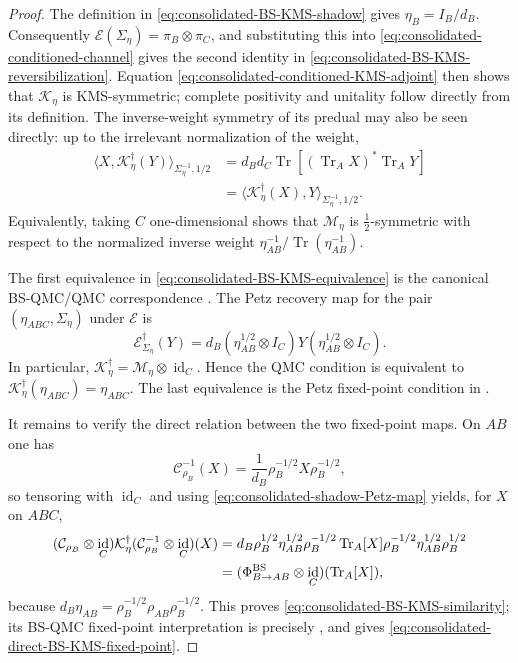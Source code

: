 \documentclass[11pt]{article}
\theoremstyle{remark}
\DeclareMathOperator{\id}{id}
\newcommand{\1}{\mathbbm{1}}
\begin{document}
\begin{proof}
The definition in \eqref{eq:consolidated-BS-KMS-shadow} gives
$\eta_B=I_B/d_B$.  Consequently
$\mathcal E(\Sigma_\eta)=\pi_B\otimes\pi_C$, and substituting this
into \eqref{eq:consolidated-conditioned-channel} gives the second
identity in \eqref{eq:consolidated-BS-KMS-reversibilization}.
Equation \eqref{eq:consolidated-conditioned-KMS-adjoint} then shows
that $\mathcal K_\eta$ is KMS-symmetric; complete positivity and
unitality follow directly from its definition.
The inverse-weight symmetry of its predual may also be seen directly:
up to the irrelevant normalization of the weight,
\begin{equation}
 \begin{aligned}
 \langle X,\mathcal K_\eta^\dagger(Y)
 \rangle_{\Sigma_\eta^{-1},1/2}
 &=d_Bd_C\operatorname{Tr}\!\left[
       (\operatorname{Tr}_A X)^*\operatorname{Tr}_A Y\right]\\
 &=\langle\mathcal K_\eta^\dagger(X),Y
 \rangle_{\Sigma_\eta^{-1},1/2}.
 \end{aligned}
 \label{eq:consolidated-predual-inverse-KMS-symmetry}
\end{equation}
Equivalently, taking $C$ one-dimensional shows that
$\mathcal M_\eta$ is $\frac12$-symmetric with respect to the
normalized inverse weight
$\eta_{AB}^{-1}/\operatorname{Tr}(\eta_{AB}^{-1})$.

The first equivalence in
\eqref{eq:consolidated-BS-KMS-equivalence} is the canonical BS-QMC/QMC
correspondence
\cite[Theorem~3.3]{Bluhm:2025kai}.  The Petz recovery map for the
pair $(\eta_{ABC},\Sigma_\eta)$ under $\mathcal E$ is
\begin{equation}
 \mathcal E_{\Sigma_\eta}^\dagger(Y)
 =d_B(\eta_{AB}^{1/2}\otimes I_C)Y
       (\eta_{AB}^{1/2}\otimes I_C).
 \label{eq:consolidated-shadow-Petz-map}
\end{equation}
In particular,
$\mathcal K_\eta^\dagger=\mathcal M_\eta\otimes\id_C$.
Hence the QMC condition is equivalent to
$\mathcal K_\eta^\dagger(\eta_{ABC})=\eta_{ABC}$.
The last equivalence is the Petz fixed-point condition in
.

It remains to verify the direct relation between the two fixed-point
maps.  On $AB$ one has
\begin{equation}
 \mathcal C_{\rho_B}^{-1}(X)
 =\frac1{d_B}\rho_B^{-1/2}X\rho_B^{-1/2},
\end{equation}
so tensoring with $\id_C$ and using
\eqref{eq:consolidated-shadow-Petz-map} yields, for $X$ on $ABC$,
\begin{align}
 (\mathcal C_{\rho_B}\otimes\id_C)\mathcal K_\eta^\dagger
 (\mathcal C_{\rho_B}^{-1}\otimes\id_C)(X)
 &={d_B}\rho_B^{1/2}\eta_{AB}^{1/2}\rho_B^{-1/2}
       \operatorname{Tr}_A[X]\rho_B^{-1/2}\eta_{AB}^{1/2}\rho_B^{1/2}\notag\\
 &= (\Phi_{B\to AB}^{\rm BS}\otimes\id_C)(\operatorname{Tr}_A[X]),
 \end{align}
because
$d_B\eta_{AB}=\rho_B^{-1/2}\rho_{AB}\rho_B^{-1/2}$.
This proves \eqref{eq:consolidated-BS-KMS-similarity}; its
BS-QMC fixed-point interpretation is precisely
\cite[Corollary~3.9]{Bluhm:2025kai}, and gives
\eqref{eq:consolidated-direct-BS-KMS-fixed-point}.


\end{proof}
\end{document}
